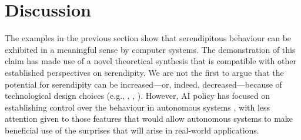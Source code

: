 \section{Discussion} \label{sec:discussion}





The examples in the previous section show that serendipitous behaviour
can be exhibited in a meaningful sense by computer systems.
The demonstration of this claim has made use of a novel theoretical
synthesis that is compatible with other established perspectives on
serendipity.  We are not the first to argue that the potential for
serendipity can be increased---or, indeed, decreased---because of
technological design choices (e.g., \cite{danzico2010design},
\cite{newman2002designing}, \cite{melo2018}).
However, AI policy has focused on establishing control over the
behaviour in autonomous systems \cite{research-priorities}, with less
attention given to those features that would allow autonomous systems
to make beneficial use of the surprises that will arise in real-world
applications.

